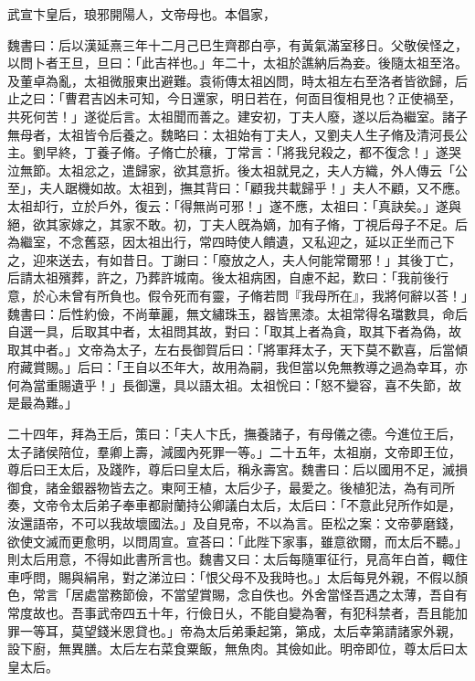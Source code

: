 
\begin{pinyinscope}
武宣卞皇后，琅邪開陽人，文帝母也。本倡家，

魏書曰：后以漢延熹三年十二月己巳生齊郡白亭，有黃氣滿室移日。父敬侯怪之，以問卜者王旦，旦曰：「此吉祥也。」年二十，太祖於譙納后為妾。後隨太祖至洛。及董卓為亂，太祖微服東出避難。袁術傳太祖凶問，時太祖左右至洛者皆欲歸，后止之曰：「曹君吉凶未可知，今日還家，明日若在，何靣目復相見也？正使禍至，共死何苦！」遂從后言。太祖聞而善之。建安初，丁夫人廢，遂以后為繼室。諸子無母者，太祖皆令后養之。魏略曰：太祖始有丁夫人，又劉夫人生子脩及清河長公主。劉早終，丁養子脩。子脩亡於穰，丁常言：「將我兒殺之，都不復念！」遂哭泣無節。太祖忿之，遣歸家，欲其意折。後太祖就見之，夫人方織，外人傳云「公至」，夫人踞機如故。太祖到，撫其背曰：「顧我共載歸乎！」夫人不顧，又不應。太祖却行，立於戶外，復云：「得無尚可邪！」遂不應，太祖曰：「真訣矣。」遂與絕，欲其家嫁之，其家不敢。初，丁夫人旣為嫡，加有子脩，丁視后母子不足。后為繼室，不念舊惡，因太祖出行，常四時使人饋遺，又私迎之，延以正坐而己下之，迎來送去，有如昔日。丁謝曰：「廢放之人，夫人何能常爾邪！」其後丁亡，后請太祖殯葬，許之，乃葬許城南。後太祖病困，自慮不起，歎曰：「我前後行意，於心未曾有所負也。假令死而有靈，子脩若問『我母所在』，我將何辭以荅！」魏書曰：后性約儉，不尚華麗，無文繡珠玉，器皆黑漆。太祖常得名璫數具，命后自選一具，后取其中者，太祖問其故，對曰：「取其上者為貪，取其下者為偽，故取其中者。」文帝為太子，左右長御賀后曰：「將軍拜太子，天下莫不歡喜，后當傾府藏賞賜。」后曰：「王自以丕年大，故用為嗣，我但當以免無教導之過為幸耳，亦何為當重賜遺乎！」長御還，具以語太祖。太祖恱曰：「怒不變容，喜不失節，故是最為難。」

二十四年，拜為王后，策曰：「夫人卞氏，撫養諸子，有母儀之德。今進位王后，太子諸侯陪位，羣卿上壽，減國內死罪一等。」二十五年，太祖崩，文帝即王位，尊后曰王太后，及踐阼，尊后曰皇太后，稱永壽宮。魏書曰：后以國用不足，滅損御食，諸金銀器物皆去之。東阿王植，太后少子，最愛之。後植犯法，為有司所奏，文帝令太后弟子奉車都尉蘭持公卿議白太后，太后曰：「不意此兒所作如是，汝還語帝，不可以我故壞國法。」及自見帝，不以為言。臣松之案：文帝夢磨錢，欲使文滅而更愈明，以問周宣。宣荅曰：「此陛下家事，雖意欲爾，而太后不聽。」則太后用意，不得如此書所言也。魏書又曰：太后每隨軍征行，見高年白首，輙住車呼問，賜與絹帛，對之涕泣曰：「恨父母不及我時也。」太后每見外親，不假以顏色，常言「居處當務節儉，不當望賞賜，念自佚也。外舍當怪吾遇之太薄，吾自有常度故也。吾事武帝四五十年，行儉日乆，不能自變為奢，有犯科禁者，吾且能加罪一等耳，莫望錢米恩貸也。」帝為太后弟秉起第，第成，太后幸第請諸家外親，設下廚，無異膳。太后左右菜食粟飯，無魚肉。其儉如此。明帝即位，尊太后曰太皇太后。


\end{pinyinscope}
